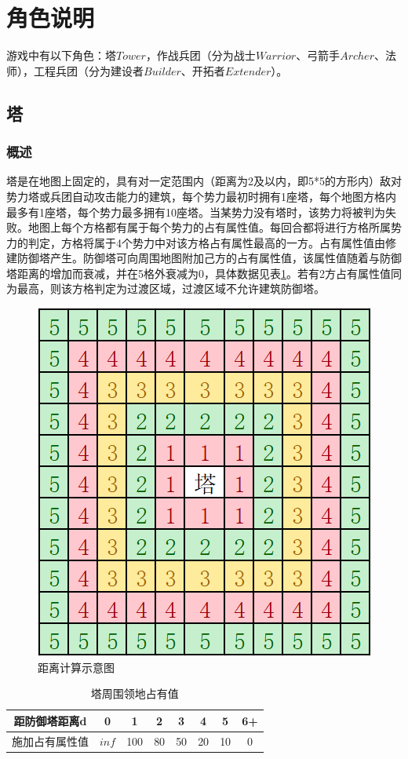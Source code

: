 \documentclass[a4paper,4pt]{article}
\begin{document}
\section{角色说明}
游戏中有以下角色：塔$Tower$，作战兵团（分为战士$Warrior$、弓箭手$Archer$、法师），工程兵团（分为建设者$Builder$、开拓者$Extender$）。
\subsection{塔}
\subsubsection{概述}
塔是在地图上固定的，具有对一定范围内（距离为2及以内，即5*5的方形内）敌对势力塔或兵团自动攻击能力的建筑，每个势力最初时拥有1座塔，每个地图方格内最多有1座塔，每个势力最多拥有10座塔。当某势力没有塔时，该势力将被判为失败。地图上每个方格都有属于每个势力的占有属性值。每回合都将进行方格所属势力的判定，方格将属于4个势力中对该方格占有属性最高的一方。占有属性值由修建防御塔产生。防御塔可向周围地图附加己方的占有属性值，该属性值随着与防御塔距离的增加而衰减，并在5格外衰减为0，具体数据见表\ref{领地}。若有2方占有属性值同为最高，则该方格判定为过渡区域，过渡区域不允许建筑防御塔。
\begin{figure}[htbp]   %
	\centering
	\includegraphics[width=2.5 in]{距离.png}
	\caption{距离计算示意图}
	\label{jpg:示例图片2}
\end{figure}

\begin{table}[htbp]
	\centering
	\caption{塔周围领地占有值}
	\begin{tabular}{c|c|c|c|c|c|c|c}
		\hline
		距防御塔距离d  & 0     & 1   & 2  & 3  & 4  & 5  & 6+ \bigstrut \\
		\hline
		施加占有属性值 & $inf$ & 100 & 80 & 50 & 20 & 10 & 0 \bigstrut  \\
		\hline
	\end{tabular}%
	\label{领地}%
\end{table}%
\end{document}
